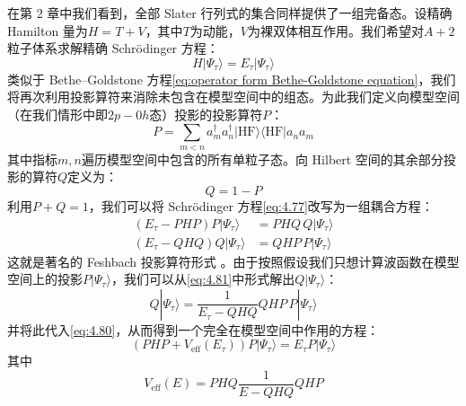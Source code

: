 在第 2 章中我们看到，全部 Slater 行列式的集合同样提供了一组完备态。设精确 Hamilton 量为$H=T+V$，其中$T$为动能，$V$为裸双体相互作用。我们希望对$A+2$粒子体系求解精确
Schrödinger 方程：
\begin{equation}
H|\Psi_{\tau}\rangle=E_{\tau}|\Psi_{\tau}\rangle\label{eq:4.77}
\end{equation}
类似于 Bethe–Goldstone 方程\ref{eq:operator form Bethe-Goldstone equation}，我们将再次利用投影算符来消除未包含在模型空间中的组态。为此我们定义向模型空间（在我们情形中即$2p-0h$态）投影的投影算符$P$：
\begin{equation}
P=\sum_{m<n}a^{\dagger}_{m}a^{\dagger}_{n}|\text{HF}\rangle\langle\text{HF}|a_{n}a_{m}\label{eq:4.78}
\end{equation}
其中指标$m,n$遍历模型空间中包含的所有单粒子态。向 Hilbert 空间的其余部分投影的算符$Q$定义为：
\begin{equation}
Q=1-P\label{eq:4.79}
\end{equation}
利用$P+Q=1$，我们可以将 Schrödinger 方程\ref{eq:4.77}改写为一组耦合方程：
\begin{align}
(E_{\tau}-PHP)P|\Psi_{\tau}\rangle & =PHQ\,Q|\Psi_{\tau}\rangle\label{eq:4.80}\\
(E_{\tau}-QHQ)Q|\Psi_{\tau}\rangle & =QHP\,P|\Psi_{\tau}\rangle\label{eq:4.81}
\end{align}
这就是著名的 Feshbach 投影算符形式 \cite{Fe62}。由于按照假设我们只想计算波函数在模型空间上的投影$P|\Psi_{\tau}\rangle$，我们可以从\ref{eq:4.81}中形式解出$Q|\Psi_{\tau}\rangle$：
\begin{equation}
Q|\Psi_{\tau}\rangle=\frac{1}{E_{\tau}-QHQ}QHP\,P|\Psi_{\tau}\rangle\label{eq:4.82}
\end{equation}
并将此代入\ref{eq:4.80}，从而得到一个完全在模型空间中作用的方程：
\begin{equation}
(PHP+V_{\text{eff}}(E_{\tau}))P|\Psi_{\tau}\rangle=E_{\tau}P|\Psi_{\tau}\rangle\label{eq:4.83}
\end{equation}
其中
\begin{equation}
V_{\text{eff}}(E)=PHQ\frac{1}{E-QHQ}QHP\label{eq:4.84}
\end{equation}

